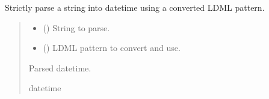 \documentclass[letterpaper,10pt,english]{sphinxmanual}
\begin{document}
\begin{fulllineitems}
\label{\detokenize{apache_commons_validator_python.util:apache_commons_validator_python.util.datetime_helpers.parse_pattern_strict}}
\pysigstartsignatures
{}
\pysigstopsignatures
\sphinxAtStartPar
Strictly parse a string into datetime using a converted LDML pattern.
\begin{quote}\begin{description}
\begin{itemize}
\item {} 
\sphinxAtStartPar
{} () \textendash{} String to parse.

\item {} 
\sphinxAtStartPar
{} () \textendash{} LDML pattern to convert and use.

\end{itemize}

\sphinxAtStartPar
Parsed datetime.

\sphinxAtStartPar
datetime

\end{description}\end{quote}

\end{fulllineitems}

\end{document}
